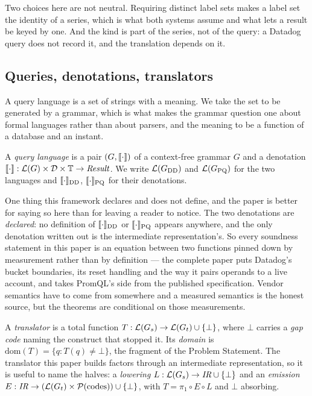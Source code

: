\noindent
Two choices here are not neutral. Requiring distinct label sets makes a label set the
identity of a series, which is what both systems assume and what lets a result be keyed
by one. And the kind is part of the series, not of the query: a Datadog query does not
record it, and the translation depends on it.

\subsection{Queries, denotations, translators}

A query language is a set of strings with a meaning. We take the set to be generated by a
grammar, which is what makes the grammar question one about formal languages rather than
about parsers, and the meaning to be a function of a database and an instant.

\begin{definition}\label{s:def:lang}
A \emph{query language} is a pair $(G,\llbracket \cdot \rrbracket)$ of a context-free grammar $G$ and a
denotation $\llbracket \cdot \rrbracket:\mathcal{L}(G)\times\mathcal{D}\times\mathbb{T}\to\mathit{Result}$. We
write $\mathcal{L}(G_{\mathrm{DD}})$ and $\mathcal{L}(G_{\mathrm{PQ}})$ for the two languages and
$\llbracket \cdot \rrbracket_{\mathrm{DD}}$, $\llbracket \cdot \rrbracket_{\mathrm{PQ}}$ for their denotations.
\end{definition}

\noindent
One thing this framework declares and does not define, and the paper is better for saying
so here than for leaving a reader to notice. The two denotations are \emph{declared}: no
definition of $\llbracket \cdot \rrbracket_{\mathrm{DD}}$ or $\llbracket \cdot \rrbracket_{\mathrm{PQ}}$ appears
anywhere, and the only denotation written out is the intermediate representation's. So
every soundness statement in this paper is an equation between two functions pinned down
by measurement rather than by definition --- the complete paper puts Datadog's bucket
boundaries, its reset handling and the way it pairs operands to a live account, and takes
PromQL's side from the published specification. Vendor semantics have to come from
somewhere and a measured semantics is the honest source, but the theorems are conditional
on those measurements.

\begin{definition}[Translator]\label{s:def:translator}
A \emph{translator} is a total function $T:\mathcal{L}(G_s)\to\mathcal{L}(G_t)\cup\{\bot\}$, where
$\bot$ carries a \emph{gap code} naming the construct that stopped it. Its \emph{domain}
is $\mathrm{dom}(T)=\{q : T(q)\neq\bot\}$, the fragment of the Problem Statement. The
translator this paper builds factors through an intermediate representation, so it is
useful to name the halves: a \emph{lowering} $L:\mathcal{L}(G_s)\to\mathit{IR}\cup\{\bot\}$ and
an \emph{emission} $E:\mathit{IR}\to(\mathcal{L}(G_t)\times\mathcal{P}(\text{codes}))
\cup\{\bot\}$, with $T=\pi_1\circ E\circ L$ and $\bot$ absorbing.
\end{definition}


